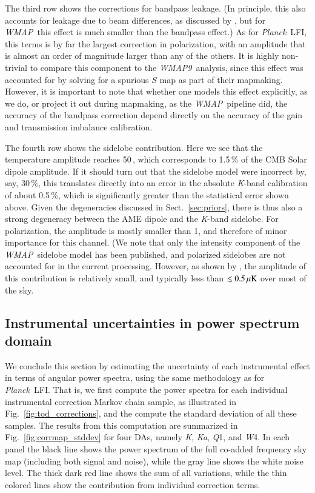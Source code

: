 \documentclass[twocolumn]{../../common/aa}
\def\WMAP{\emph{WMAP}}
\def\WMAPnine{\emph{WMAP9}}
\def\Planck{\emph{Planck}}
\newcommand{\K}[0]{\textit K}
\newcommand{\Ka}[0]{\textit{Ka}}
\newcommand{\Q}[0]{\textit Q}
\newcommand{\W}[0]{\textit W}
\begin{document}
The third row shows the corrections for bandpass leakage. (In principle, this also accounts for leakage due to beam differences, as discussed by \citet{bp09}, but for \WMAP\ this effect is much smaller than the bandpass effect.) As for \Planck\ LFI, this terms is by far the largest correction in polarization, with an amplitude that is almost an order of magnitude larger than any of the others. It is highly non-trivial to compare this component to the \WMAPnine\ analysis, since this effect was accounted for by solving for a spurious $S$ map as part of their mapmaking. However, it is important to note that whether one models this effect explicitly, as we do, or project it out during mapmaking, as the \WMAP\ pipeline did, the accuracy of the bandpass correction depend directly on the accuracy of the gain and transmission imbalance calibration.

The fourth row shows the sidelobe contribution. Here we see that the temperature amplitude reaches 50\,\muK, which corresponds to 1.5\,\% of the CMB Solar dipole amplitude. If it should turn out that the sidelobe model were incorrect by, say, 30\,\%, this translates directly into an error in the absolute \K-band calibration of about 0.5\,\%, which is significantly greater than the statistical error shown above. Given the degeneracies discussed in Sect.~\ref{sec:priors}, there is thus also a strong degeneracy between the AME dipole and the \K-band sidelobe. For polarization, the amplitude is mostly smaller than 1\muK, and therefore of minor importance for this channel. (We note that only the intensity component of the \WMAP\ sidelobe model has been published, and polarized sidelobes are not accounted for in the current processing. However, as shown by \citet{barnes2003}, the amplitude of this contribution is relatively small, and typically less than {\color{red} $\lesssim0.5\muK$} over most of the sky.




\subsection{Instrumental uncertainties in power spectrum domain }

We conclude this section by estimating the uncertainty of each instrumental effect in terms of angular power spectra, using the same methodology as \citet{bp10} for \Planck\ LFI. That is, we first compute the power spectra for each individual instrumental correction Markov chain sample, as illustrated in Fig.~\ref{fig:tod_corrections}, and the compute the standard deviation of all these samples. The results from this computation are summarized in Fig.~\ref{fig:corrmap_stddev} for four DAs, namely \K, \Ka, \Q1, and \W4. In each panel the black line shows the power spectrum of the full co-added frequency sky map (including both signal and noise), while the gray line shows the white noise level. The thick dark red line shows the sum of all variations, while the thin colored lines show the contribution from individual correction terms.
\end{document}
